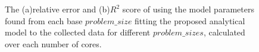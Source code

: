 \vspace{\baselineskip}
\begin{figure}[H]
	\centering
	\label{fig63:a}
	\label{fig63:b}
	\caption{The (a)relative error and (b)$R^2$ score of using the model parameters found from each base $problem\_{size}$ fitting the proposed analytical model to the collected data for different $problem\_{sizes}$, calculated over each number of cores.}\label{fig63}
\end{figure}

